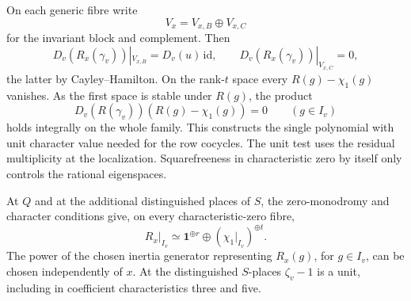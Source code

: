 On each generic fibre write
\[
 V_x=V_{x,B}\oplus V_{x,C}
\]
for the invariant block and complement. Then
\[
 D_v(R_x(\gamma_v))|_{V_{x,B}}=D_v(u)\,\mathrm{id},
 \qquad D_v(R_x(\gamma_v))|_{V_{x,C}}=0,
\]
the latter by Cayley--Hamilton. On the rank-\(t\)
space every \(R(g)-\chi_1(g)\) vanishes. As the first space
is stable under \(R(g)\), the product
\[
       D_v(R(\gamma_v))(R(g)-\chi_1(g))=0
       \qquad(g\in I_v)
\]
holds integrally on the whole family. This constructs the single
polynomial with unit character value needed for the row cocycles.
The unit test uses the residual multiplicity at the localization.
Squarefreeness in characteristic zero by itself only controls
the rational eigenspaces. \label{cor:retained-galois-4}

\begin{lemma}\label{lem:retained-inertia-types}
At \(Q\) and at the additional distinguished places of \(S\),
the zero-monodromy and character conditions give, on every characteristic-zero fibre,
\[
 R_x|_{I_v}\simeq \mathbf1^{\oplus r}\oplus(\chi_1|_{I_v})^{\oplus t}.
\] The power of the chosen inertia generator representing
\(R_x(g)\), for \(g\in I_v\), can be chosen independently of \(x\).
At the distinguished \(S\)-places \(\zeta_v-1\) is a unit, including
in coefficient characteristics three and five.
\end{lemma}

